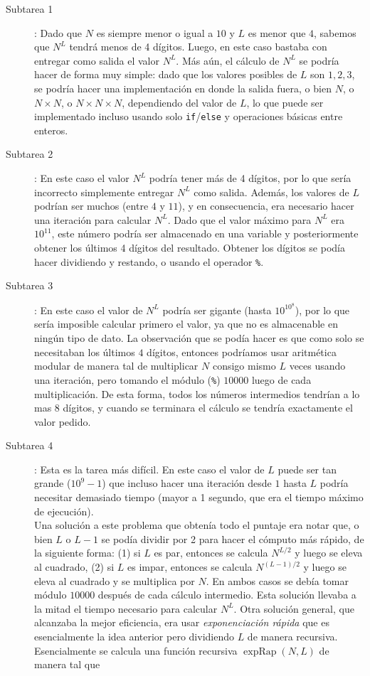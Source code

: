 \begin{description}
\item[Subtarea 1]: Dado que $N$ es siempre menor o igual
a $10$ y $L$ es menor que $4$, sabemos que $N^L$ tendrá menos de 4 dígitos.
Luego, en este caso bastaba con entregar como salida el valor $N^L$.
Más aún, el cálculo de $N^L$ se podría hacer de forma muy simple:
dado que los valores posibles de $L$ son $1,2,3$,
se podría hacer una implementación en donde la salida fuera,
o bien $N$, o $N\times N$, o $N\times N\times N$, dependiendo del valor de $L$,
lo que puede ser implementado incluso usando solo \texttt{if}/\texttt{else} y
operaciones básicas entre enteros.

\item[Subtarea 2]: En este caso el valor $N^L$ podría tener más de 4 dígitos, por lo que sería incorrecto simplemente entregar $N^L$ como salida.
Además, los valores de $L$ podrían ser muchos (entre $4$ y $11$),
y en consecuencia, era necesario hacer una iteración para calcular $N^L$.
Dado que el valor máximo para $N^L$ era $10^{11}$, este número podría ser
almacenado en una variable y posteriormente obtener los últimos 4 dígitos del resultado.
Obtener los dígitos se podía hacer dividiendo y restando, o usando el
operador \texttt{\%}.

\item[Subtarea 3]: En este caso el valor de $N^L$ podría ser gigante (hasta $10^{10^8}$), por lo que sería imposible calcular primero el valor, ya que no es almacenable en ningún tipo de dato.
La observación que se podía hacer es que como solo se necesitaban los últimos $4$ dígitos, entonces podríamos usar aritmética modular de manera tal de multiplicar $N$ consigo mismo $L$ veces usando una iteración, pero tomando el módulo (\texttt{\%}) $10000$ luego de cada multiplicación. De esta
forma, todos los números intermedios tendrían a lo mas $8$ dígitos, y cuando se terminara el cálculo se tendría exactamente el valor pedido.


\item[Subtarea 4]: Esta es la tarea más difícil. En este caso el valor de $L$ puede ser tan grande ($10^9-1$) que incluso hacer una iteración desde $1$ hasta $L$ podría necesitar demasiado tiempo (mayor a 1 segundo, que era el tiempo máximo de ejecución).\\
Una solución a este problema que obtenía todo el puntaje era notar que, o bien
$L$ o $L-1$ se podía dividir por 2 para hacer el cómputo más rápido, de la
siguiente forma: (1) si $L$ es par, entonces se calcula $N^{L/2}$ y luego se
eleva al cuadrado, (2) si $L$ es impar, entonces se calcula $N^{(L-1)/2}$ y
luego se eleva al cuadrado y se multiplica por $N$.
En ambos casos se debía tomar módulo $10000$ después de cada cálculo intermedio.
Esta solución llevaba a la mitad el tiempo necesario para calcular $N^L$.
Otra solución general, que alcanzaba la mejor eficiencia, era usar
\emph{exponenciación rápida}%
que es esencialmente la idea anterior pero dividiendo $L$ de manera recursiva.
Esencialmente se calcula una función recursiva $\operatorname{expRap}(N,L)$ de manera tal que


\end{description}

